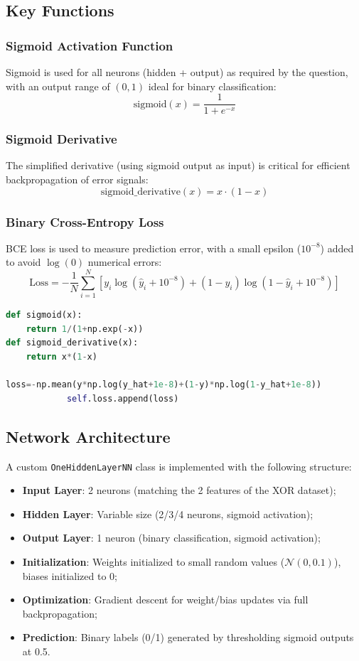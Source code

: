 \documentclass[11pt]{article}
\begin{document}
\subsection{Key Functions}
\subsubsection{Sigmoid Activation Function}
Sigmoid is used for all neurons (hidden + output) as required by the question, with an output range of $(0,1)$ ideal for binary classification:
\[
\text{sigmoid}(x) = \frac{1}{1+e^{-x}}
\]
\subsubsection{Sigmoid Derivative}
The simplified derivative (using sigmoid output as input) is critical for efficient backpropagation of error signals:
\[
\text{sigmoid\_derivative}(x) = x \cdot (1-x)
\]
\subsubsection{Binary Cross-Entropy Loss}
BCE loss is used to measure prediction error, with a small epsilon ($10^{-8}$) added to avoid $\log(0)$ numerical errors:
\[
\text{Loss} = -\frac{1}{N}\sum_{i=1}^N \left[ y_i\log(\hat{y}_i+10^{-8}) + (1-y_i)\log(1-\hat{y}_i+10^{-8}) \right]
\]
\begin{lstlisting}[language=Python, frame=single, caption={Key Functions}]
def sigmoid(x):
    return 1/(1+np.exp(-x))
def sigmoid_derivative(x):
    return x*(1-x)

loss=-np.mean(y*np.log(y_hat+1e-8)+(1-y)*np.log(1-y_hat+1e-8))
            self.loss.append(loss)
\end{lstlisting}

\subsection{Network Architecture}
A custom \texttt{OneHiddenLayerNN} class is implemented with the following structure:
\begin{itemize}
    \item \textbf{Input Layer}: 2 neurons (matching the 2 features of the XOR dataset);
    \item \textbf{Hidden Layer}: Variable size (2/3/4 neurons, sigmoid activation);
    \item \textbf{Output Layer}: 1 neuron (binary classification, sigmoid activation);
    \item \textbf{Initialization}: Weights initialized to small random values ($\mathcal{N}(0,0.1)$), biases initialized to 0;
    \item \textbf{Optimization}: Gradient descent for weight/bias updates via full backpropagation;
    \item \textbf{Prediction}: Binary labels (0/1) generated by thresholding sigmoid outputs at 0.5.
\end{itemize}
\end{document}
